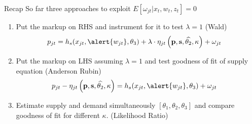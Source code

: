 \begin{frame}{Recap}
\small
So far three approaches to exploit $ E[\omega_{jt} | x_{t},w_{t},z_{t}]=0$
\begin{enumerate}
\item Put the markup on RHS and instrument for it to test $\lambda=1$ (Wald)
\begin{align*}
 p_{jt} &= h_s(x_{jt}, \alert{w_{jt}},\theta_3) + \lambda \cdot \eta_{jt}\left(\mathbf{p},\mathbf{s},\widehat{\theta_2},\kappa \right)+  \omega_{jt}
\end{align*}
\item Put the markup on LHS assuming $\lambda=1$ and test goodness of fit of supply equation (Anderson Rubin)
\begin{align*}
 p_{jt} -\eta_{jt}\left(\mathbf{p},\mathbf{s},\widehat{\theta_2},\kappa \right)&= h_s(x_{jt}, \alert{w_{jt}},\theta_3) +  \omega_{jt}
\end{align*}
\item Estimate supply and demand simultaneously $[\theta_1,\theta_2,\theta_3]$ and compare goodness of fit for different $\kappa$. (Likelihood Ratio)
\end{enumerate}

\end{frame}



